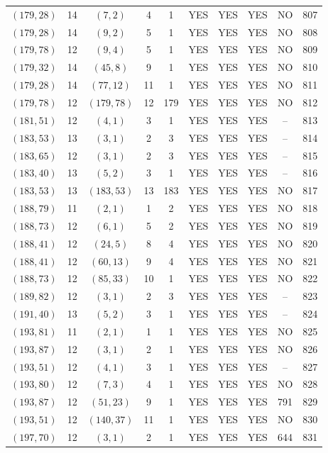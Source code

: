 \begin{longtable}{|c|c|c|c|c|c|c|c|c|c|}
$(179, 28)$ & 14 & $(7, 2)$ & 4 & 1 & YES & YES & YES & NO & 807\\
$(179, 28)$ & 14 & $(9, 2)$ & 5 & 1 & YES & YES & YES & NO & 808\\
$(179, 78)$ & 12 & $(9, 4)$ & 5 & 1 & YES & YES & YES & NO & 809\\
$(179, 32)$ & 14 & $(45, 8)$ & 9 & 1 & YES & YES & YES & NO & 810\\
$(179, 28)$ & 14 & $(77, 12)$ & 11 & 1 & YES & YES & YES & NO & 811\\
$(179, 78)$ & 12 & $(179, 78)$ & 12 & 179 & YES & YES & YES & NO & 812\\
$(181, 51)$ & 12 & $(4, 1)$ & 3 & 1 & YES & YES & YES & -- & 813\\
$(183, 53)$ & 13 & $(3, 1)$ & 2 & 3 & YES & YES & YES & -- & 814\\
$(183, 65)$ & 12 & $(3, 1)$ & 2 & 3 & YES & YES & YES & -- & 815\\
$(183, 40)$ & 13 & $(5, 2)$ & 3 & 1 & YES & YES & YES & -- & 816\\
$(183, 53)$ & 13 & $(183, 53)$ & 13 & 183 & YES & YES & YES & NO & 817\\
$(188, 79)$ & 11 & $(2, 1)$ & 1 & 2 & YES & YES & YES & NO & 818\\
$(188, 73)$ & 12 & $(6, 1)$ & 5 & 2 & YES & YES & YES & NO & 819\\
$(188, 41)$ & 12 & $(24, 5)$ & 8 & 4 & YES & YES & YES & NO & 820\\
$(188, 41)$ & 12 & $(60, 13)$ & 9 & 4 & YES & YES & YES & NO & 821\\
$(188, 73)$ & 12 & $(85, 33)$ & 10 & 1 & YES & YES & YES & NO & 822\\
$(189, 82)$ & 12 & $(3, 1)$ & 2 & 3 & YES & YES & YES & -- & 823\\
$(191, 40)$ & 13 & $(5, 2)$ & 3 & 1 & YES & YES & YES & -- & 824\\
$(193, 81)$ & 11 & $(2, 1)$ & 1 & 1 & YES & YES & YES & NO & 825\\
$(193, 87)$ & 12 & $(3, 1)$ & 2 & 1 & YES & YES & YES & NO & 826\\
$(193, 51)$ & 12 & $(4, 1)$ & 3 & 1 & YES & YES & YES & -- & 827\\
$(193, 80)$ & 12 & $(7, 3)$ & 4 & 1 & YES & YES & YES & NO & 828\\
$(193, 87)$ & 12 & $(51, 23)$ & 9 & 1 & YES & YES & YES & 791 & 829\\
$(193, 51)$ & 12 & $(140, 37)$ & 11 & 1 & YES & YES & YES & NO & 830\\
$(197, 70)$ & 12 & $(3, 1)$ & 2 & 1 & YES & YES & YES & 644 & 831\\

\end{longtable}
